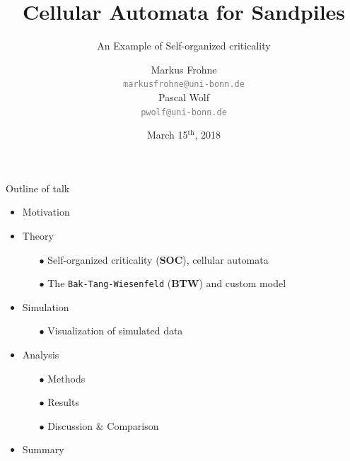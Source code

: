 \documentclass[xcolor=dvipsnames]{beamer}
\title[Sandpiles]{Cellular Automata for Sandpiles}
\subtitle{An Example of Self-organized criticality}
\author[M. Frohne \& P. Wolf]{Markus Frohne\\ \texttt{\textcolor{gray}{markusfrohne@uni-bonn.de}}\\
        \vspace{0.33cm} Pascal Wolf\\ \texttt{\textcolor{gray}{pwolf@uni-bonn.de}}}
\date{March 15$^\text{th}$, 2018}
\newcommand{\myitemsep}{\setlength\itemsep{0.33cm}}
\newcommand{\mysubitemsep}{\setlength\itemsep{0.22cm}}
\begin{document}
    
    \begin{frame}
        \titlepage
    \end{frame}
    
    \begin{frame}{Outline of talk}
        \begin{itemize}
            \myitemsep
            \item Motivation
            \item {Theory
                \vspace{0.22cm}
                \begin{itemize}
                    \mysubitemsep
                    \item[$\bullet$] Self-organized criticality (\textbf{SOC}), cellular automata
                    \item[$\bullet$] The \texttt{Bak-Tang-Wiesenfeld} (\textbf{BTW}) and custom model
                \end{itemize}}
            \item {Simulation
                \vspace{0.22cm}
                \begin{itemize}
                    \mysubitemsep
                    \item[$\bullet$] Visualization of simulated data
                \end{itemize}}
            \item {Analysis 
                \vspace{0.22cm}
                \begin{itemize}
                    \mysubitemsep
                    \item[$\bullet$] Methods
                    \item[$\bullet$] Results
                    \item[$\bullet$] Discussion \& Comparison
                \end{itemize}}
            \item Summary
        \end{itemize}
    \end{frame}
    
\end{document}

